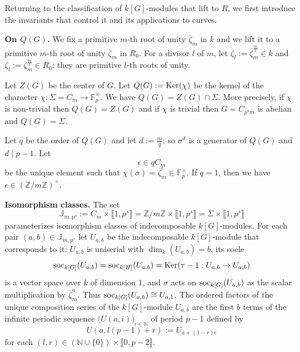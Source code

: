 \documentclass[11pt]{amsart}
\def\soc{\textup{soc}}
\def\Ker{\textup{Ker}}
\begin{document}
Returning to the classification of $k[G]$-modules that lift to $R$, we first introduce the invariants that control it and its applications to curves.

{\bf On $Q(G)$.} We fix a primitive $m$-th root of unity $\overline{\zeta}_m$ in $k$ and we lift it to a primitive $m$-th root of unity $\zeta_m$ in $R_0$. For a divisor $l$ of $m$, let $\overline{\zeta}_l:=\overline{\zeta}_m^{\frac{m}{l}}\in k$ and $\zeta_l:=\zeta_m^{\frac{m}{l}}\in R_0$; they are primitive $l$-th roots of unity. 

Let $Z(G)$ be the center of $G$. Let $Q(G):=\Ker(\chi)$ be the kernel of the character $\chi:\Sigma=C_m\rightarrow\mathbb F_p^{\times}$. We have $Q(G)=Z(G)\cap\Sigma$. More precisely, if $\chi$ is non-trivial then $Q(G)=Z(G)$ and if $\chi$ is trivial then $G=C_{p^sm}$ is abelian and $Q(G)=\Sigma$.

Let $q$ be the order of $Q(G)$ and let $d:=\frac{m}{q}$; so $\sigma^d$ is a generator of $Q(G)$ and $d\mid p-1$. Let 
$$\epsilon\in qC_m$$ 
be the unique element such that $\chi(\sigma)=\overline{\zeta}_m^{\epsilon}\in\mathbb F_p^{\times}$. If $q=1$, then we have $\epsilon\in (\mathbb Z/m\mathbb Z)^{\times}$.

{\bf Isomorphism classes.} The set 
$$\mathbb J_{m,p^s}:=C_m\times\llbracket1,p^s\rrbracket=\mathbb Z/m\mathbb Z\times\llbracket1,p^s\rrbracket=\Sigma\times\llbracket1,p^s\rrbracket$$
parameterizes isomorphism classes of indecomposable $k[G]$-modules. For each pair $(a,b)\in\mathbb J_{m,p^s}$ let $U_{a,b}$ be the indecomposable $k[G]$-module that corresponds to it: $U_{a,b}$ is uniserial with $\dim_k(U_{a,b})=b$, its socle 
\begin{equation}\label{EQ2}
\soc_{k[G]}(U_{a,b})=\soc_{k[H]}(U_{a,b})=\Ker(\tau-1:U_{a,b}\rightarrow U_{a,b})
\end{equation}
is a vector space over $k$ of dimension $1$, and $\sigma$ acts on $\soc_{k[G]}(U_{a,b})$ as the scalar multiplication by $\overline{\zeta}_m^a$. Thus $\soc_{k[G]}(U_{a,b})\cong U_{a,1}$. The ordered factors of the unique composition series of the $k[G]$-module $U_{a,b}$ are the first $b$ terms of the infinite periodic sequence $\bigl(U(a,i)\bigr)_{i\in\mathbb N}$ of period $p-1$ defined by
\begin{equation}\label{EQ3}
U(a,l(p-1)+r):=U_{a+(1-r)\epsilon}
\end{equation}
for each $(l,r)\in(\mathbb N\cup\{0\})\times\llbracket0,p-2\rrbracket$.
\end{document}
